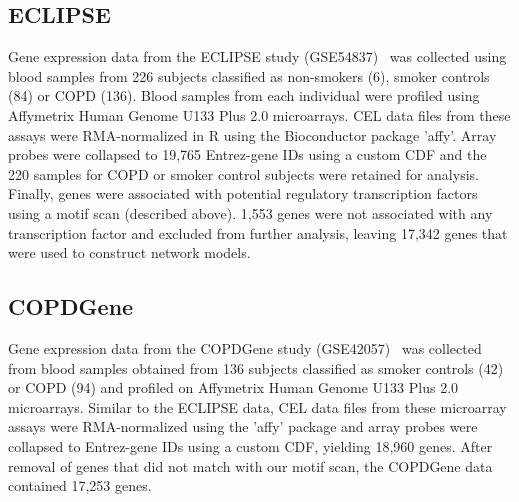 \subsection*{ECLIPSE}
Gene expression data from the ECLIPSE study (GSE54837)~\cite{singh2014altered} was collected using blood samples from 226 subjects classified as non-smokers (6), smoker controls (84) or COPD (136). Blood samples from each individual were profiled using Affymetrix Human Genome U133 Plus 2.0 microarrays. CEL data files from these assays were RMA-normalized\cite{irizarry2003exploration} in R using the Bioconductor package 'affy'\cite{gautier2004affy}. Array probes were collapsed to 19,765 Entrez-gene IDs using a custom CDF\cite{dai2005evolving} and the 220 samples for COPD or smoker control subjects were retained for analysis. Finally, genes were associated with potential regulatory transcription factors using a motif scan (described above). 1,553 genes were not associated with any transcription factor and excluded from further analysis, leaving 17,342 genes that were used to construct network models.

\subsection*{COPDGene}
Gene expression data from the COPDGene study (GSE42057)~\cite{bahr2013peripheral,regan2011genetic} was collected from blood samples obtained from 136 subjects classified as smoker controls (42) or COPD (94) and profiled on  Affymetrix Human Genome U133 Plus 2.0  microarrays. Similar to the ECLIPSE data, CEL data files from these microarray assays were RMA-normalized using the 'affy' package and array probes were collapsed to Entrez-gene IDs using a custom CDF\cite{dai2005evolving}, yielding 18,960 genes. After removal of genes that did not match with our motif scan, the COPDGene data contained 17,253 genes.

